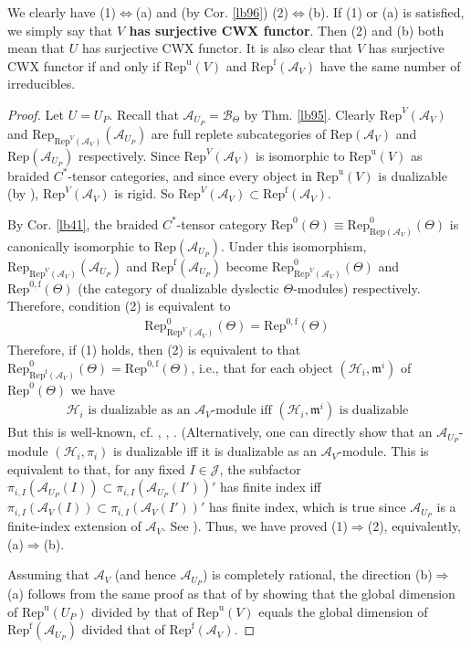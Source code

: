 \documentclass[11pt,b5paper,notitlepage]{article}
\theoremstyle{definition}
\theoremstyle{plain}
\newcommand{\mc}{\mathcal}
\newcommand{\Rep}{\mathrm{Rep}}
\newcommand{\Repf}{\mathrm{Rep}^{\mathrm f}}
\newcommand{\uni}{\mathrm{u}}
\newcommand{\RepV}{{\mathrm{Rep}^\uni(V)}}
\newcommand{\mk}{\mathfrak m}
\newcommand{\RepUP}{\mathrm{Rep}^{\mathrm u}(U_P)}
\numberwithin{equation}{section}
\begin{document}
We clearly have (1)$\Leftrightarrow$(a) and (by Cor. \ref{lb96}) (2)$\Leftrightarrow$(b). If (1) or (a) is satisfied, we simply say that \textbf{$V$ has surjective CWX functor}. Then (2) and (b) both mean that $U$ has surjective CWX functor. It is also clear that $V$ has surjective CWX functor if and only if $\RepV$ and $\Repf(\mc A_V)$ have the same number of irreducibles. 

\begin{proof}
Let $U=U_P$. Recall that $\mc A_{U_P}=\mc B_\Theta$ by Thm. \ref{lb95}. Clearly $\Rep^V(\mc A_V)$ and $\Rep_{\Rep^V(\mc A_V)}(\mc A_{U_P})$ are full replete subcategories of $\Rep(\mc A_V)$ and $\Rep(\mc A_{U_P})$ respectively. Since $\Rep^V(\mc A_V)$ is isomorphic to $\RepV$ as braided  $C^*$-tensor categories, and since every object in $\RepV$ is dualizable (by \cite{Hua08b}), $\Rep^V(\mc A_V)$ is rigid. So $\Rep^V(\mc A_V)\subset \Repf(\mc A_V)$. 

By Cor. \ref{lb41}, the braided $C^*$-tensor category $\Rep^0(\Theta)\equiv\Rep^0_{\Rep(\mc A_V)}(\Theta)$ is canonically isomorphic to $\Rep(\mc A_{U_P})$. Under this isomorphism, $\Rep_{\Rep^V(\mc A_V)}(\mc A_{U_P})$ and $\Repf(\mc A_{U_P})$ become $\Rep^0_{\Rep^V(\mc A_V)}(\Theta)$ and $\Rep^{0,\mathrm f}(\Theta)$ (the category of dualizable dyslectic $\Theta$-modules) respectively. Therefore, condition (2) is equivalent to
\begin{align}
\Rep^0_{\Rep^V(\mc A_V)}(\Theta)=\Rep^{0,\mathrm f}(\Theta)
\end{align}
Therefore, if (1) holds, then (2) is equivalent to that $\Rep^0_{\Repf(\mc A_V)}(\Theta)=\Rep^{0,\mathrm f}(\Theta)$, i.e., that for each object $(\mc H_i,\mk^i)$ of $\Rep^0(\Theta)$ we have
\begin{gather}\label{eq88}
\text{$\mc H_i$ is dualizable as an $\mc A_V$-module iff $(\mc H_i,\mk^i)$ is dualizable}
\end{gather}
But this is well-known, cf. \cite[Thm. 1.15]{KO02}, \cite[Sec. 6]{NY16}, \cite[Thm. 3.18]{Gui22}. (Alternatively, one can directly show that an $\mc A_{U_P}$-module $(\mc H_i,\pi_i)$ is dualizable iff it is dualizable as an $\mc A_V$-module. This is equivalent to that, for any fixed $I\in\mc J$, the subfactor $\pi_{i,I}(\mc A_{U_P}(I))\subset\pi_{i,I}(\mc A_{U_P}(I'))'$ has finite index iff $\pi_{i,I}(\mc A_V(I))\subset\pi_{i,I}(\mc A_V(I'))'$ has finite index, which is true since $\mc A_{U_P}$ is a finite-index extension of $\mc A_V$. See \cite{Lon89,Lon90,Kos98,BDH14}). Thus, we have proved (1)$\Rightarrow$(2), equivalently, (a)$\Rightarrow$(b).

Assuming that $\mc A_V$ (and hence $\mc A_{U_P}$) is completely rational, the direction (b)$\Rightarrow$(a) follows from the same proof as that of \cite[Thm. 2.7.2]{Gui20} by showing that the global dimension of $\RepUP$ divided by that of $\RepV$ equals the global dimension of $\Repf(\mc A_{U_P})$ divided that of $\Repf(\mc A_V)$. 
\end{proof}
\end{document}
